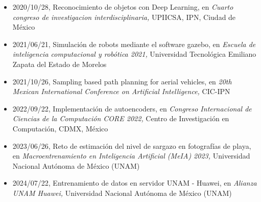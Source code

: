 \begin{itemize} 
\item 2020/10/28, Reconocimiento de objetos con Deep Learning, en \textit{ Cuarto congreso de investigacion interdisciplinaria,} UPIICSA, IPN, Ciudad de México 
\item 2021/06/21, Simulación de robots mediante el software gazebo, en \textit{ Escuela de inteligencia computacional y robótica 2021,} Universidad Tecnológica Emiliano Zapata del Estado de Morelos 
\item 2021/10/26, Sampling based path planning for aerial vehicles, en \textit{ 20th Mexican International Conference on Artificial Intelligence,} CIC-IPN 
\item 2022/09/22, Implementación de autoencoders, en \textit{ Congreso Internacional de Ciencias de la Computación CORE 2022,} Centro de Investigación en Computación, CDMX, México 
\item 2023/06/26, Reto de estimación del nivel de sargazo en fotografías de playa, en \textit{ Macroentrenamiento en Inteligencia Artificial (MeIA) 2023,} Universidad Nacional Autónoma de México (UNAM) 
\item 2024/07/22, Entrenamiento de datos en servidor UNAM - Huawei, en \textit{ Alianza UNAM Huawei,} Universidad Nacional Autónoma de México (UNAM) 
\end{itemize} 
